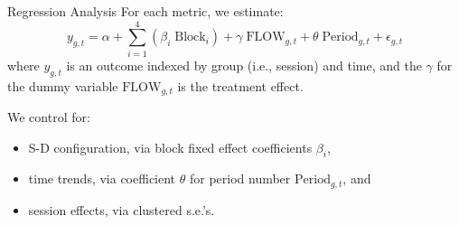 \documentclass[10pt]{beamer}
\begin{document}
\begin{frame}{Regression Analysis}
For each metric, we estimate: 
\begin{equation} \label{eq:reg}
    y_{g,t} = \alpha + \sum^{4}_{i = 1} \left(\beta_i \; \text{Block}_i\right) + \gamma \; \text{FLOW}_{g,t} + \theta \; \text{Period}_{g,t} + \epsilon_{g,t}
\end{equation}
where $y_{g,t}$ is an outcome  indexed by group (i.e., session) and time, and the $\gamma$ for the dummy variable $\text{FLOW}_{g,t}$ is the treatment effect. %

We control for: 
\begin{itemize}
\item S-D configuration, via  block fixed effect coefficients $\beta_i$,  
\item time trends, via coefficient $\theta$ for period number $\text{Period}_{g,t}$, and
\item session effects, via clustered s.e.'s.
\end{itemize} %
 
\end{frame}
\end{document}

